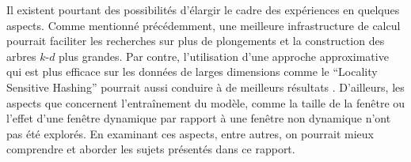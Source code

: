 \documentclass[12pt]{article}
\begin{document}
Il existent pourtant des possibilités d'élargir le cadre des expériences en quelques aspects. Comme mentionné précédemment, une meilleure infrastructure de calcul pourrait faciliter les recherches sur plus de plongements et la construction des arbres $k$-$d$ plus grandes. Par contre, l'utilisation d'une approche approximative qui est plus efficace sur les données de larges dimensions comme le ``Locality Sensitive Hashing'' pourrait aussi conduire à de meilleurs résultats \citep{andoni2008near}. D'ailleurs, les aspects que concernent l'entraînement du modèle, comme la taille de la fenêtre ou l'effet d'une fenêtre dynamique par rapport à une fenêtre non dynamique n'ont pas été explorés. En examinant ces aspects, entre autres, on pourrait mieux comprendre et aborder les sujets présentés dans ce rapport. 

\newpage


 
\end{document}
